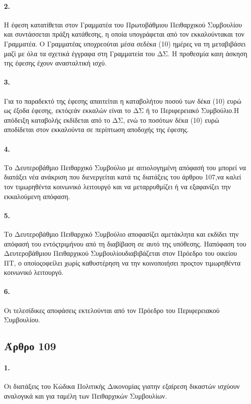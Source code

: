 \documentclass[a4paper,oneside, 10pt]{book}
\begin{document}
\paragraph { 2. } Η έφεση κατατίθεται στον Γραμματέα του Πρωτοβάθμιου Πειθαρχικού Συμβουλίου και συντάσσεται πράξη κατάθεσης, η οποία υπογράφεται από τον εκκαλούντακαι τον Γραμματέα. Ο Γραμματέας υποχρεούται μέσα σεδέκα (10) ημέρες να τη μεταβιβάσει μαζί με όλα τα σχετικά έγγραφα στη Γραμματεία του ΔΣ. Η προθεσμία καιη άσκηση της έφεσης έχουν ανασταλτική ισχύ.
\paragraph { 3. } Για το παραδεκτό της έφεσης απαιτείται η καταβολήτου ποσού των δέκα (10) ευρώ ως έξοδα έφεσης, εκτόςεάν εκκαλών είναι το ΔΣ ή το Περιφερειακό Συμβούλιο.Η απόδειξη καταβολής εκδίδεται από το ΔΣ, ενώ το ποσότων δέκα (10) ευρώ αποδίδεται στον εκκαλούντα σε περίπτωση αποδοχής της έφεσης.
\paragraph { 4. } Το Δευτεροβάθμιο Πειθαρχικό Συμβούλιο με αιτιολογημένη απόφασή του μπορεί να διατάξει νέα ανάκριση που διενεργείται κατά τις διατάξεις του άρθρου 107,να καλεί τον τιμωρηθέντα κοινωνικό λειτουργό και να μεταρρυθμίζει ή να εξαφανίζει την εκκαλούμενη απόφαση.
\paragraph { 5. } Το Δευτεροβάθμιο Πειθαρχικό Συμβούλιο αποφασίζει αμετάκλητα και εκδίδει την απόφασή του εντόςτριμήνου από τη διαβίβαση σε αυτό της υπόθεσης. Ηαπόφαση του Δευτεροβάθμιου Πειθαρχικού Συμβουλίουδιαβιβάζεται στον Πρόεδρο του οικείου ΠΤ, ο οποίοςοφείλει χωρίς καθυστέρηση να την κοινοποιήσει προςτον τιμωρηθέντα κοινωνικό λειτουργό.
\paragraph { 6. } Οι τελεσίδικες αποφάσεις εκτελούνται από τον Πρόεδρο του Περιφερειακού Συμβουλίου.
\subsection*{ Άρθρο 109 }
\paragraph { 1. } Οι διατάξεις του Κώδικα Πολιτικής Δικονομίας γιατην εξαίρεση δικαστών ισχύουν αναλογικά και για ταμέλη των Πειθαρχικών Συμβουλίων.
\end{document}
